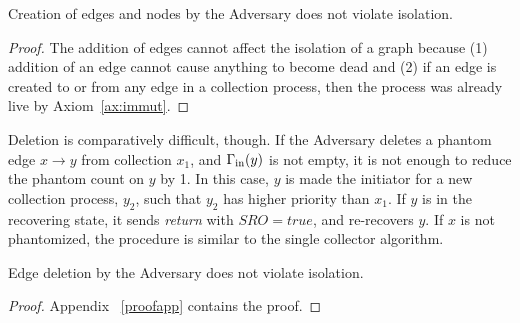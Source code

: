 \begin{lemma}
Creation of edges and nodes by the Adversary does not violate isolation.
\label{creationI}
\end{lemma}
\begin{proof}
The addition of edges cannot affect the isolation of a graph because (1) addition
of an edge cannot cause anything to become dead and (2) if an edge is created to
or from any edge in a collection process, then the process was already live by
Axiom~\ref{ax:immut}.
\end{proof}

Deletion is comparatively difficult, though.
If the Adversary deletes a phantom edge $x \rightarrow y$ from collection $x_1$, and $\Gamma_{\rm in}(y)$ is not empty,
it is not enough to reduce
the phantom count on $y$ by 1. In this case, $y$ is made the
initiator for a new collection process, $y_2$, such that $y_2$ has higher priority than $x_1$. If $y$ is in
the recovering state, it sends \emph{return} with $SRO = true$,
and re-recovers $y$.  If $x$ is not phantomized, the
procedure is similar to the single collector algorithm.

\begin{lemma}
Edge deletion by the Adversary does not violate isolation.
\label{deletionI}
\end{lemma}
\begin{proof}
Appendix ~\ref{proofapp} contains the proof.
\end{proof}


